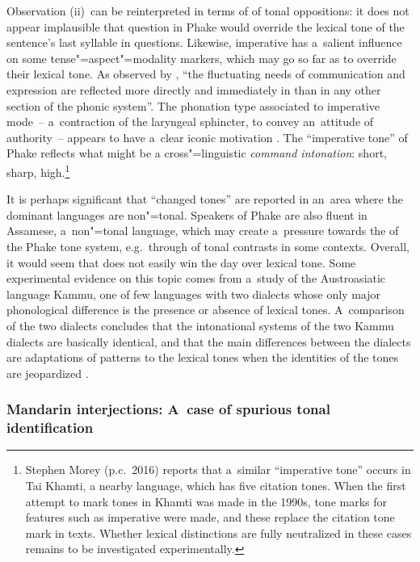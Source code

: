 Observation (ii)~can be reinterpreted
in terms of  of tonal oppositions: it does not appear implausible that {question}
 in Phake would override the lexical tone of the sentence’s last syllable in questions. Likewise, {imperative}  has a~salient influence on some tense"=aspect"=modality markers, which may go so far
as to override their lexical tone. As observed by \citet{martinet1957}, “the fluctuating needs of communication and expression are
reflected more directly and immediately in  than in any other section of the phonic
system”. The phonation type associated to {imperative} mode~-- a~contraction of
the laryngeal sphincter, to convey an~attitude of authority~-- appears to have a~clear iconic
motivation \citep[see][113--126]{fonagy1983}. The “{imperative} tone” of Phake reflects what might be a cross"=linguistic \textit{command intonation}: short, sharp, high.\footnote{Stephen Morey (p.c.\ 2016) reports that a~similar “{imperative} tone” occurs in Tai Khamti, a nearby language, which has five citation tones. When the first attempt to mark tones in Khamti was made in the 1990s, tone marks for features such as {imperative} were made, and these replace the citation tone mark in texts. Whether lexical distinctions are fully neutralized in these cases remains to be investigated experimentally.}

It is perhaps significant that “changed tones” are reported in an~area where the dominant languages
are non"=tonal. Speakers of Phake are also fluent in Assamese, a~non"=tonal language, which may create
a~pressure towards the  of the Phake tone system, e.g.~through  of tonal
contrasts in some contexts. Overall, it would seem that  does not easily win the day over
lexical tone. Some experimental evidence on this topic comes from a~study of the Austroasiatic
language Kammu, one of few languages with two dialects whose only major phonological difference is
the presence or absence of lexical tones. A~comparison of the two dialects concludes that the
intonational systems of the two Kammu dialects are basically identical, and that the main
differences between the dialects are adaptations of  patterns to the lexical tones when
the identities of the tones are jeopardized \citep{karlssonetal2012}.

\subsubsection{Mandarin interjections: A~case of spurious tonal identification}

